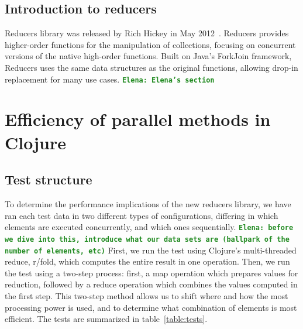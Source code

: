 \documentclass[12pt]{article}
\newcommand{\comment}[1]{{\bf \tt  {#1}}}
\newcommand{\emcomment}[1]{\textcolor{ForestGreen}{\comment{Elena: {#1}}}}
\newcommand{\joecomment}[1]{\textcolor{JoesGold}{\comment{Joe: {#1}}}}
\begin{document}
\subsection{Introduction to reducers}\label{sec:reducers}
Reducers library was released by Rich Hickey in May 2012~\cite{HickeyReducers}. Reducers provides higher-order functions for the manipulation of collections, focusing on concurrent versions of the native high-order functions.  Built on Java's ForkJoin framework, Reducers uses the same data structures as the original functions, allowing drop-in replacement for many use cases.
\emcomment{Elena's section}

\section{Efficiency of parallel methods in Clojure}\label{sec:efficiency} 

\subsection{Test structure}\label{sec:testStruct}
To determine the performance implications of the new reducers library, we have ran each test data in two different types of configurations, differing in which elements are executed concurrently, and which ones sequentially. 
\emcomment{before we dive into this, introduce what our data sets are (ballpark of the number of elements, etc)}
First, we run the test using Clojure's multi-threaded reduce, r/fold, which computes the entire result in one operation. Then, we run the test using a two-step process: first, a map operation which prepares values for reduction, followed by a reduce operation which combines the values computed in the first step. This two-step method allows us to shift where and how the most processing power is used, and to determine what combination of elements is most efficient.
The tests are summarized in table~\ref{table:tests}.
\end{document}
